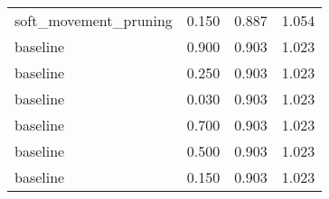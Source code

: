 \begin{tabular}{lrrr}
soft\_movement\_pruning &   0.150 &          0.887 &      1.054 \\
             baseline &   0.900 &          0.903 &      1.023 \\
             baseline &   0.250 &          0.903 &      1.023 \\
             baseline &   0.030 &          0.903 &      1.023 \\
             baseline &   0.700 &          0.903 &      1.023 \\
             baseline &   0.500 &          0.903 &      1.023 \\
             baseline &   0.150 &          0.903 &      1.023 \\
\bottomrule
\end{tabular}
